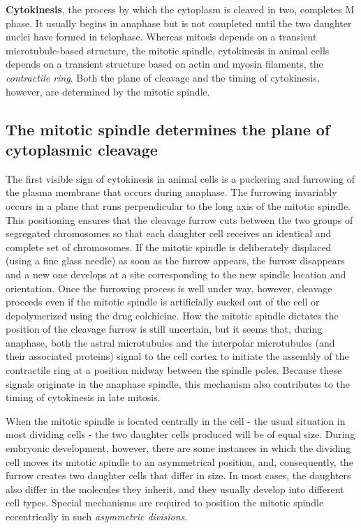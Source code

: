 \textbf{Cytokinesis}, the process by which the cytoplasm is cleaved in two,
completes M phase. It usually begins in anaphase but is not completed
until the two daughter nuclei have formed in telophase. Whereas mitosis
depends on a transient microtubule-based structure, the mitotic spindle,
cytokinesis in animal cells depends on a transient structure based on
actin and myosin filaments, the \textit{contractile ring}. Both
the plane of cleavage and the timing of cytokinesis, however, are determined
by the mitotic spindle.

\subsection{The mitotic spindle determines the plane of cytoplasmic cleavage}

The first visible sign of cytokinesis in animal cells is a puckering and furrowing
of the plasma membrane that occurs during anaphase.
The furrowing invariably occurs in a plane that runs perpendicular
to the long axis of the mitotic spindle. This positioning ensures that
the cleavage furrow cuts between the two groups of segregated chromosomes
so that each daughter cell receives an identical and complete set of
chromosomes. If the mitotic spindle is deliberately displaced (using a fine
glass needle) as soon as the furrow appears, the furrow disappears and
a new one develops at a site corresponding to the new spindle location
and orientation. Once the furrowing process is well under way, however,
cleavage proceeds even if the mitotic spindle is artificially sucked out
of the cell or depolymerized using the drug colchicine. How the mitotic
spindle dictates the position of the cleavage furrow is still uncertain,
but it seems that, during anaphase, both the astral microtubules and
the interpolar microtubules (and their associated proteins) signal to the
cell cortex to initiate the assembly of the contractile ring at a position
midway between the spindle poles. Because these signals originate in
the anaphase spindle, this mechanism also contributes to the timing of
cytokinesis in late mitosis.

When the mitotic spindle is located centrally in the cell - the usual situation
in most dividing cells - the two daughter cells produced will be of
equal size. During embryonic development, however, there are some
instances in which the dividing cell moves its mitotic spindle to an asymmetrical
position, and, consequently, the furrow creates two daughter
cells that differ in size. In most cases, the daughters also differ in the
molecules they inherit, and they usually develop into different cell types.
Special mechanisms are required to position the mitotic spindle eccentrically
in such \textit{asymmetric divisions}.


